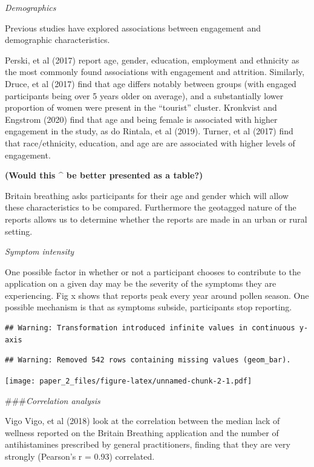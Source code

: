 \documentclass[
]{article}
\begin{document}
\emph{Demographics}

Previous studies have explored associations between engagement and
demographic characteristics.

Perski, et al (2017) report age, gender, education, employment and
ethnicity as the most commonly found associations with engagement and
attrition. Similarly, Druce, et al (2017) find that age differs notably
between groups (with engaged participants being over 5 years older on
average), and a substantially lower proportion of women were present in
the ``tourist'' cluster. Kronkvist and Engstrom (2020) find that age and
being female is associated with higher engagement in the study, as do
Rintala, et al (2019). Turner, et al (2017) find that race/ethnicity,
education, and age are are associated with higher levels of engagement.

\textbf{(Would this \^{} be better presented as a table?)}

Britain breathing asks participants for their age and gender which will
allow these characteristics to be compared. Furthermore the geotagged
nature of the reports allows us to determine whether the reports are
made in an urban or rural setting.

\emph{Symptom intensity}

One possible factor in whether or not a participant chooses to
contribute to the application on a given day may be the severity of the
symptoms they are experiencing. Fig x shows that reports peak every year
around pollen season. One possible mechanism is that as symptoms
subside, participants stop reporting.

\begin{verbatim}
## Warning: Transformation introduced infinite values in continuous y-axis
\end{verbatim}

\begin{verbatim}
## Warning: Removed 542 rows containing missing values (geom_bar).
\end{verbatim}

\texttt{[image: paper\_2\_files/figure-latex/unnamed-chunk-2-1.pdf]}

\#\#\#\emph{Correlation analysis}

Vigo Vigo, et al (2018) look at the correlation between the median lack
of wellness reported on the Britain Breathing application and the number
of antihistamines prescribed by general practitioners, finding that they
are very strongly (Pearson's r = 0.93) correlated.
\end{document}

